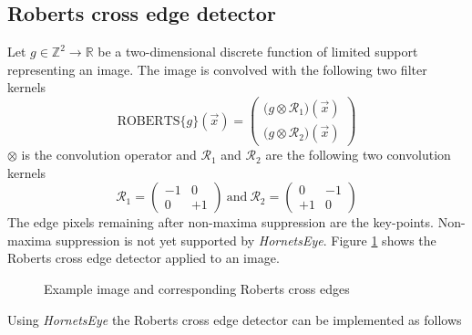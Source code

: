 \documentclass[a4paper,12pt]{book}
\begin{document}
\subsection{Roberts cross edge detector}
Let $g\in\mathbb{Z}^2\to\mathbb{R}$ be a two-dimensional discrete function
of limited support representing an image.
The image is convolved with the following two filter kernels
\begin{equation*}
  \mathrm{ROBERTS}\{g\}(\vec{x})=\begin{pmatrix}
    \big(g\otimes\mathcal{R}_1\big)(\vec{x}) \\
    \big(g\otimes\mathcal{R}_2\big)(\vec{x})
  \end{pmatrix}
\end{equation*}
$\otimes$ is the convolution operator and $\mathcal{R}_1$ and $\mathcal{R}_2$
are the following two convolution kernels\cite{roberts}
\begin{equation*}
  \mathcal{R}_1=\begin{pmatrix} -1 &  0 \\ 0 & +1 \end{pmatrix}
  \mathrm{\ and\ }
  \mathcal{R}_2=\begin{pmatrix}  0 & -1 \\ +1 &  0 \end{pmatrix}
\end{equation*}
The edge pixels remaining after non-maxima suppression are the
key-points. Non-maxima suppression is not yet supported by \emph{HornetsEye}.
Figure \ref{fig:roberts} shows the Roberts cross edge detector applied to
an image.
\begin{figure}[htbp]
   \begin{center}
     \begin{minipage}[c]{.45\textwidth}
     \end{minipage}
     \begin{minipage}[c]{.45\textwidth}
     \end{minipage}
     \caption{Example image and corresponding Roberts cross edges\label{fig:roberts}}
   \end{center}
\end{figure}

Using \emph{HornetsEye} the Roberts cross edge detector can be implemented
as follows
\begin{scriptsize}
  
\end{scriptsize}
\end{document}
